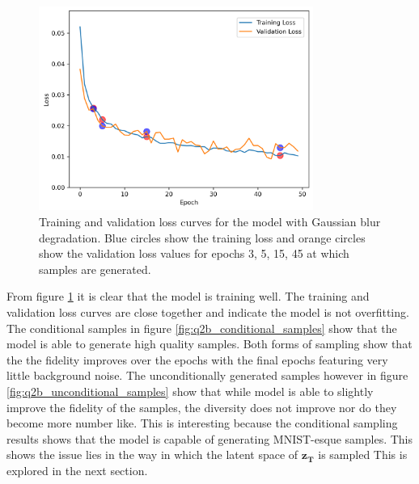 \documentclass[11pt]{article}
\begin{document}
\begin{figure}[H]
    \centering
    \includegraphics[width=0.8\textwidth]{figs/q2b_blur_loss.png}
    \caption{Training and validation loss curves for the model with Gaussian blur degradation. Blue circles show the training loss and orange circles show the validation loss values for epochs 3, 5, 15, 45 at which samples are generated.}
    \label{fig:q2b_loss}
\end{figure}


From figure \ref{fig:q2b_loss} it is clear that the model is training well. The training and validation loss curves are close together and indicate the model is not overfitting. The conditional samples in figure \ref{fig:q2b_conditional_samples} show that the model is able to generate high quality samples. Both forms of sampling show that the the fidelity improves over the epochs with the final epochs featuring very little background noise. The unconditionally generated samples however  in figure \ref{fig:q2b_unconditional_samples} show that while model is able to slightly improve the fidelity of the samples, the diversity does not improve nor do they become more number like. This is interesting because the conditional sampling results shows that the model is capable of generating MNIST-esque samples. This shows the issue lies in the way in which the latent space of $\mathbf{z_T}$ is sampled
This is explored in the next section.
\end{document}
